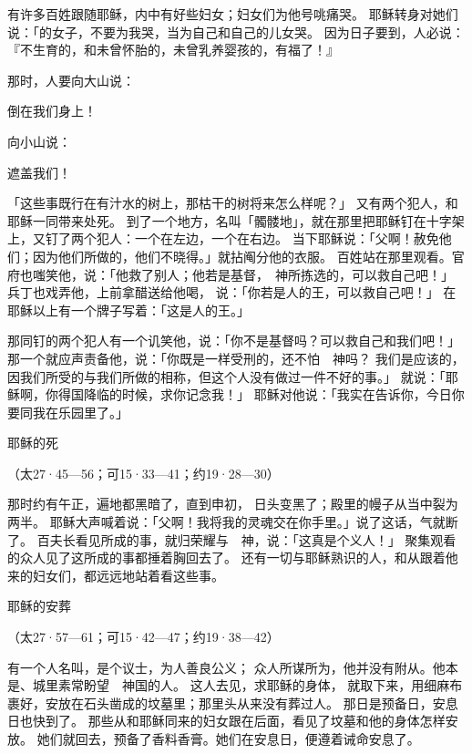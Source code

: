 {有许多百姓跟随耶稣，内中有好些妇女；妇女们为他号咷痛哭。
耶稣转身对她们说：「{}的女子，不要为我哭，当为自己和自己的儿女哭。
因为日子要到，人必说：『不生育的，和未曾怀胎的，未曾乳养婴孩的，有福了！』
\par }{\PP {}那时，人要向大山说：
\par }{\Q 倒在我们身上！
\par }{\Q 向小山说：
\par }{\Q 遮盖我们！
\par }{\PP {}「这些事既行在有汁水的树上，那枯干的树将来怎么样呢？」
又有两个犯人，和耶稣一同带来处死。
到了一个地方，名叫「髑髅地」，就在那里把耶稣钉在十字架上，又钉了两个犯人：一个在左边，一个在右边。
当下耶稣说：「父啊！赦免他们；因为他们所做的，他们不晓得。」{}就拈阄分他的衣服。
百姓站在那里观看。官府也嗤笑他，说：「他救了别人；他若是基督，　神所拣选的，可以救自己吧！」
兵丁也戏弄他，上前拿醋送给他喝，
说：「你若是{}人的王，可以救自己吧！」
在耶稣以上有一个牌子写着：「这是{}人的王。」
\par }{\PP {}那同钉的两个犯人有一个讥笑他，说：「你不是基督吗？可以救自己和我们吧！」
那一个就应声责备他，说：「你既是一样受刑的，还不怕　神吗？
我们是应该的，因我们所受的与我们所做的相称，但这个人没有做过一件不好的事。」
就说：「耶稣啊，你得国降临的时候，求你记念我！」
耶稣对他说：「我实在告诉你，今日你要同我在乐园里了。」
\par }{\SH 耶稣的死
\par }{\R （太27·45—56；可15·33—41；约19·28—30）
\par }{\PP {}那时约有午正，遍地都黑暗了，直到申初，
日头变黑了；殿里的幔子从当中裂为两半。
耶稣大声喊着说：「父啊！我将我的灵魂交在你手里。」说了这话，气就断了。
百夫长看见所成的事，就归荣耀与　神，说：「这真是个义人！」
聚集观看的众人见了这所成的事都捶着胸回去了。
还有一切与耶稣熟识的人，和从{}跟着他来的妇女们，都远远地站着看这些事。
\par }{\SH 耶稣的安葬
\par }{\R （太27·57—61；可15·42—47；约19·38—42）
\par }{\PP {}有一个人名叫{}，是个议士，为人善良公义；
众人所谋所为，他并没有附从。他本是{}、{}城里素常盼望　神国的人。
这人去见{}，求耶稣的身体，
就取下来，用细麻布裹好，安放在石头凿成的坟墓里；那里头从来没有葬过人。
那日是预备日，安息日也快到了。
那些从{}和耶稣同来的妇女跟在后面，看见了坟墓和他的身体怎样安放。
她们就回去，预备了香料香膏。她们在安息日，便遵着诫命安息了。

}
